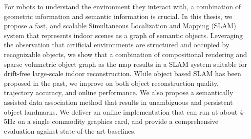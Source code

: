 
\setlength{\parskip}{1em}
\setlength{\parindent}{0em}

\noindent
For robots to understand the environment they interact with, a combination of geometric information and semantic information is crucial. In this thesis, we propose a fast, and scalable Simultaneous Localization and Mapping (SLAM) system that represents indoor scenes as a graph of semantic objects. Leveraging the observation that artificial environments are structured and occupied by recognizable objects, we show that a combination of compositional rendering and sparse volumetric object graph as the map results in a SLAM system suitable for drift-free large-scale indoor reconstruction. While object based SLAM has been proposed in the past, we improve on both object reconstruction quality, trajectory accuracy, and online performance. We also propose a semantically assisted data association method that results in unambiguous and persistent object landmarks. We deliver an online implementation that can run at about 4-5Hz on a single commodity graphics card, and provide a comprehensive evaluation against state-of-the-art baselines.
